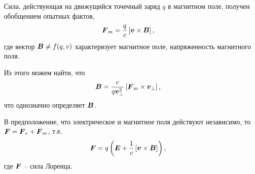 \begin{to_law} 
    Сила, действующая на движущийся точечный заряд $q$ в магнитном поле, получен обобщением опытных фактов,
    \begin{equation}
         \mbox{\boldmath $F$}_m = \frac{q}{c} \left[\mbox{\boldmath $v$} \times \mbox{\boldmath $B$}\right],
     \end{equation} 
    где вектор $\mbox{\boldmath $B$} \neq f(q, v)$ характеризует магнитное поле, напряженность магнитного поля.
\end{to_law}

Из этого можем найти, что
$$
    \mbox{\boldmath $B$} = \frac{c}{q \mbox{\boldmath $v$}^2_{\bot}} \left[
        \mbox{\boldmath $F$}_m \times \mbox{\boldmath $v$}_{\bot}
    \right],
$$
что однозначно определяет $\mbox{\boldmath $B$}$.

В предположение, что электрическое и магнитное поля действуют независимо, то $\mbox{\boldmath $F$} = \mbox{\boldmath $F$}_e + \mbox{\boldmath $F$}_m$, т.е.
$$
    \mbox{\boldmath $F$} = q \left(
        \mbox{\boldmath $E$} + \frac{1}{c} \left[\mbox{\boldmath $v$} \times \mbox{\boldmath $B$}\right]
    \right),
$$
где $\mbox{\boldmath $F$}$ -- сила Лоренца.




